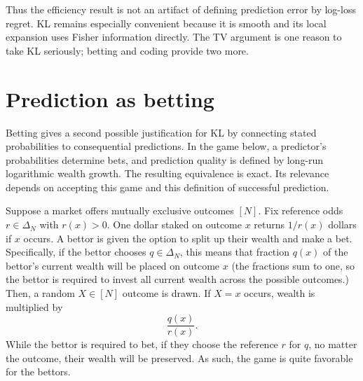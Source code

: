 \documentclass[11pt,twoside]{article}
\theoremstyle{definition}
\theoremstyle{remark}
\begin{document}
Thus the efficiency result is not an artifact of defining prediction error by
log-loss regret. KL remains especially convenient because it is smooth and its
local expansion uses Fisher information directly. The TV argument is one reason
to take KL seriously; betting and coding provide two more.

\section{Prediction as betting}
\label{sec:betting}

Betting gives a second possible justification for KL by connecting stated
probabilities to consequential predictions. In the game below, a predictor's
probabilities determine bets, and prediction quality is defined by long-run
logarithmic wealth growth. The resulting equivalence is exact. Its relevance
depends on accepting this game and this definition of successful prediction.

Suppose a market offers mutually exclusive outcomes $[N]$. Fix reference odds
$r\in\Delta_N$ with $r(x)>0$. One dollar staked on outcome $x$ returns
$1/r(x)$ dollars if $x$ occurs. A bettor
is given the option to split up their wealth and make a bet.
Specifically, if the bettor chooses $q\in \Delta_N$, this means that
fraction $q(x)$ of the bettor's current wealth will be placed on outcome $x$
(the fractions sum to one, so the bettor is required to invest all current wealth across
the possible outcomes.)
Then, a random $X\in [N]$ outcome is drawn.
If $X=x$ occurs, wealth is multiplied by
\begin{equation}
\frac{q(x)}{r(x)}.
\label{eq:wealth-multiplier}
\end{equation}
While the bettor is required to bet, if they choose the reference $r$
for $q$, no matter the outcome, their wealth will be preserved.
As such, the game is quite favorable for the bettors.
\end{document}
